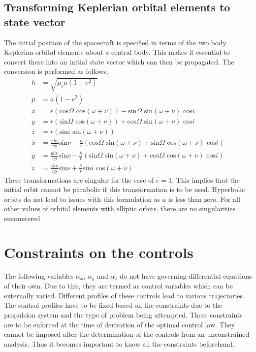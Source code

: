 \subsection{Transforming Keplerian orbital elements to state vector}
The initial position of the spacecraft is specified in terms of the two body Keplerian orbital elements about a central body. This makes it essential to convert these into an initial state vector which can then be propagated. The conversion is performed as follows,
\begin{align}
	h&=\sqrt{\mu_c a (1-e^2)}\\
	p&=a(1-e^2)\\
	x&=r(\text{cos}\Omega \text{ cos}(\omega+\nu))-\text{sin}\Omega \text{ sin}(\omega+\nu)\text{ cos}i\\
	y&=r(\text{sin}\Omega \text{ cos}(\omega+\nu))+\text{cos}\Omega \text{ sin}(\omega+\nu)\text{ cos}i\\
	z&=r(\text{sin}i \text{ sin}(\omega+\nu))\\
	\dot{x}&=\frac{xhe}{rp}\text{sin}\nu-\frac{h}{r}(\text{cos}\Omega\text{ sin}(\omega+\nu)+\text{sin}\Omega \text{ cos}(\omega+\nu)\text{ cos}i)\\
	\dot{y}&=\frac{yhe}{rp}\text{sin}\nu-\frac{h}{r}(\text{sin}\Omega\text{ sin}(\omega+\nu)+\text{cos}\Omega \text{ cos}(\omega+\nu)\text{ cos}i)\\
	\dot{z}&=\frac{zhe}{rp}\text{sin}\nu+\frac{h}{r}\text{sin}i\text{ cos}(\omega+\nu)
\end{align}
These transformations are singular for the case of $e=1$. This implies that the initial orbit cannot be parabolic if this transformation is to be used. Hyperbolic orbits do not lead to issues with this formulation as $a$ is less than zero. For all other values of orbital elements with elliptic orbits, there are no singularities encountered.

\section{Constraints on the controls}
The following variables $\alpha_x$, $\alpha_y$ and $\alpha_z$ do not have governing differential equations of their own. Due to this, they are termed as control variables which can be externally varied. Different profiles of these controls lead to various trajectories. The control profiles have to be fixed based on the constraints due to the propulsion system and the type of problem being attempted. These constraints are to be enforced at the time of derivation of the optimal control law. They cannot be imposed after the determination of the controls from an unconstrained analysis. Thus it becomes important to know all the constraints beforehand.
